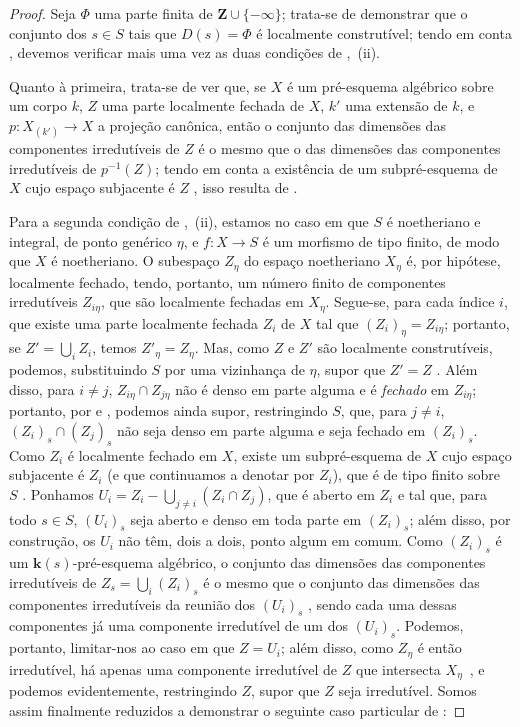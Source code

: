 \begin{proof}
Seja $\Phi$ uma parte finita de $\mathbf{Z}\cup\{-\infty\}$; trata-se de demonstrar que o conjunto dos $s\in S$ tais que $D(s)=\Phi$ é localmente construtível; tendo em conta , devemos verificar mais uma vez as duas condições de ,~(ii).

Quanto à primeira, trata-se de ver que, se $X$ é um pré-esquema algébrico sobre um corpo $k$, $Z$ uma parte localmente fechada de $X$, $k'$ uma extensão de $k$, e $p:X_{(k')}\to X$ a projeção canônica, então o conjunto das dimensões das componentes irredutíveis de $Z$ é o mesmo que o das dimensões das componentes irredutíveis de $p^{-1}(Z)$; tendo em conta a existência de um subpré-esquema de $X$ cujo espaço subjacente é $Z$ , isso resulta de .

Para a segunda condição de ,~(ii), estamos no caso em que $S$ é noetheriano e integral, de ponto genérico $\eta$, e $f:X\to S$ é um morfismo de tipo finito, de modo que $X$ é noetheriano.
O subespaço $Z_\eta$ do espaço noetheriano $X_\eta$ é, por hipótese, localmente fechado, tendo, portanto, um número finito de componentes irredutíveis $Z_{i\eta}$, que são localmente fechadas em $X_\eta$.
Segue-se, para cada índice $i$, que existe uma parte localmente fechada $Z_i$ de $X$ tal que $(Z_i)_\eta=Z_{i\eta}$; portanto, se $Z'=\bigcup_i Z_i$, temos $Z'_\eta=Z_\eta$.
Mas, como $Z$ e $Z'$ são localmente construtíveis, podemos, substituindo $S$ por uma vizinhança de $\eta$, supor que $Z'=Z$ .
Além disso, para $i\neq j$, $Z_{i\eta}\cap Z_{j\eta}$ não é denso em parte alguma e é \emph{fechado} em $Z_{i\eta}$; portanto, por  e , podemos ainda supor, restringindo $S$, que, para $j\neq i$, $(Z_i)_s\cap(Z_j)_s$ não seja denso em parte alguma e seja fechado em $(Z_i)_s$.
Como $Z_i$ é localmente fechado em $X$, existe um subpré-esquema de $X$ cujo espaço subjacente é $Z_i$ (e que continuamos a denotar por $Z_i$), que é de tipo finito sobre $S$ .
Ponhamos $U_i=Z_i-\bigcup_{j\neq i}(Z_i\cap Z_j)$, que é aberto em $Z_i$ e tal que, para todo $s\in S$, $(U_i)_s$ seja aberto e denso em toda parte em $(Z_i)_s$; além disso, por construção, os $U_i$ não têm, dois a dois, ponto algum em comum.
Como $(Z_i)_s$ é um $\boldsymbol{k}(s)$-pré-esquema algébrico, o conjunto das dimensões das componentes irredutíveis de $Z_s=\bigcup_i(Z_i)_s$ é o mesmo que o conjunto das dimensões das componentes irredutíveis da reunião dos $(U_i)_s$ , sendo cada uma dessas componentes já uma componente irredutível de um dos $(U_i)_s$.
Podemos, portanto, limitar-nos ao caso em que $Z=U_i$; além disso, como $Z_\eta$ é então irredutível, há apenas uma componente irredutível de $Z$ que intersecta $X_\eta$~, e podemos evidentemente, restringindo $Z$, supor que $Z$ seja irredutível.
Somos assim finalmente reduzidos a demonstrar o seguinte caso particular de :
\end{proof}

